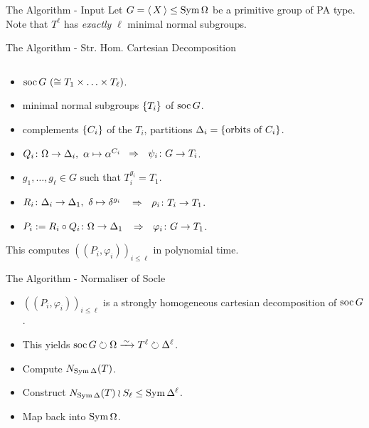 \begin{frame}{The Algorithm - Input}
    \centering
    \large
    Let $G =  \left\langle \, X \, \right\rangle  \leq \operatorname{Sym} \Omega$ be a primitive group of PA type.
    \\[1em]
    \pause
    Note that $T ^ \ell$ has \emph{exactly} $\ell$ minimal normal subgroups.
\end{frame}

\begin{frame}{The Algorithm - Str. Hom. Cartesian Decomposition}
    \begin{alg}
        $~$
        \\[-1em]
        \begin{itemize}
            \item
            $\operatorname{soc} G ~ (\cong T_1 \times \ldots \times T_\ell)$.
            \pause
            \item
            minimal normal subgroups $ \left\{  T_i  \right\} $ of $\operatorname{soc} G$.
            \pause
            \item
            complements $ \left\{  C_i  \right\} $ of the $T_i$,
            partitions $\Delta_i =  \left\{  \text{orbits of } C_i  \right\} $.
            \pause
            \item
            $Q_i \colon \Omega \rightarrow \Delta_i,
            ~ \alpha \mapsto \alpha ^ {C_i}$
            \pause
            $~\Rightarrow~~ \psi_i \colon G \rightarrow T_i$.
            \pause
            \item
            $g_1, \ldots, g_\ell \in G$ such that $T_i ^ {g_i} = T_1$.
            \pause
            \item
            $R_i \colon \Delta_i \rightarrow \Delta_1,
            ~ \delta \mapsto \delta ^ {g_i}$
            \pause
            $~~\Rightarrow~~ \rho_i \colon T_i \rightarrow T_1$.
            \pause
            \item
            $P_i := R_i \circ Q_i \colon \Omega \rightarrow \Delta_1$
            \pause
            $~~\Rightarrow~~ \varphi_i \colon G \rightarrow T_1$.
        \end{itemize}
    \end{alg}
    \pause

    This computes
    $((P_i, \varphi_i))_{i \leq \ell}$
    in polynomial time.
\end{frame}

\begin{frame}{The Algorithm - Normaliser of Socle}
    \begin{itemize}
        \item
        $((P_i, \varphi_i))_{i \leq \ell}$
        is a strongly homogeneous cartesian decomposition of $\operatorname{soc} G$.
        \pause
        \item
        This yields
        $\soc G \circlearrowright \Omega
        \iso
        T ^ \ell \circlearrowright \Delta ^ \ell$.
        \pause
        \item
        Compute $N_{\operatorname{Sym} \Delta}(T)$.
        \pause
        \item
        Construct $N_{\operatorname{Sym} \Delta}(T) \wr S_\ell \leq \operatorname{Sym} \Delta ^ \ell$.
        \pause
        \item
        Map back into $\operatorname{Sym} \Omega$.
    \end{itemize}
\end{frame}

